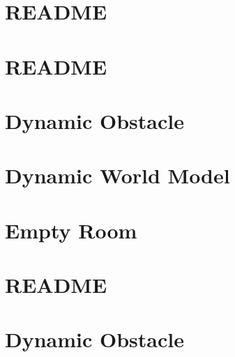 \documentclass[twoside]{book}
\newcommand{\+}{\discretionary{\mbox{\scriptsize$\hookleftarrow$}}{}{}}
\begin{document}
\chapter{README}
\label{md_smacc2_sm_reference_library_sm_autoware_avp_README}

\chapter{README}
\label{md_smacc2_sm_reference_library_sm_branching_README}

\chapter{Dynamic Obstacle}
\label{md_smacc2_sm_reference_library_sm_dance_bot_models_dynamic_obstacle_README}

\chapter{Dynamic World Model}
\label{md_smacc2_sm_reference_library_sm_dance_bot_models_dynamic_world_README}

\chapter{Empty Room}
\label{md_smacc2_sm_reference_library_sm_dance_bot_models_empty_room_README}

\chapter{README}
\label{md_smacc2_sm_reference_library_sm_dance_bot_README}

\chapter{Dynamic Obstacle}
\label{md_smacc2_sm_reference_library_sm_dance_bot_strikes_back_models_dynamic_obstacle_README}

\end{document}
